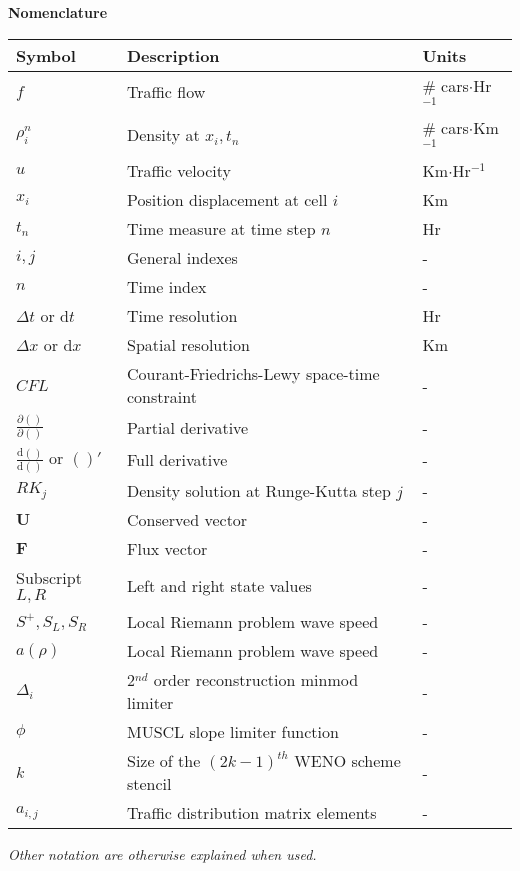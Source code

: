 \mbox{} \vspace{25mm}

\Huge \textbf{Nomenclature} \normalsize


\vspace{15mm}
\begin{center}
\begin{tabular}{l l l}
	\textbf{Symbol} & \textbf{Description} & \textbf{Units} \\
	\hline
	$f$ & Traffic flow & \# cars$\cdot$Hr$^{-1}$\\
	$\rho_i^n$ & Density at $x_i,t_n$ & \# cars$\cdot$Km$^{-1}$\\
	$u$ & Traffic velocity & Km$\cdot$Hr$^{-1}$\\
	$x_i$ & Position displacement at cell $i$ & Km\\
	$t_n$ & Time measure at time step $n$ & Hr\\
	$i,j$ & General indexes & -\\
	$n$ & Time index & -\\
	$\Delta t$ or d$t$ & Time resolution & Hr\\
	$\Delta x$ or d$x$ & Spatial resolution & Km\\
	$CFL$ & Courant-Friedrichs-Lewy space-time constraint & -\\
	\hline
	$\frac{\partial()}{\partial()}$ & Partial derivative & -\\
	$\frac{\mathrm{d}()}{\mathrm{d}()}$ or $()'$& Full derivative & -\\
	$RK_j$ & Density solution at Runge-Kutta step $j$ & -\\
	\hline
	$\mathbf{U}$ & Conserved vector & -\\
	$\mathbf{F}$ & Flux vector & -\\
	\hline
	Subscript $L,R$ & Left and right state values & -\\
	$S^+,S_L,S_R$ & Local Riemann problem wave speed & -\\
	$a(\rho)$ & Local Riemann problem wave speed & -\\
	\hline
	$\Delta_i$ & 2$^{nd}$ order reconstruction minmod limiter & -\\
	$\phi$ & MUSCL slope limiter function & -\\
	$k$ & Size of the $(2k-1)^{th}$ WENO scheme stencil & - \\
	\hline
	$a_{i,j}$ & Traffic distribution matrix elements & - 
\end{tabular}
\end{center}


\vspace{15mm}
\emph{Other notation are otherwise explained when used.}